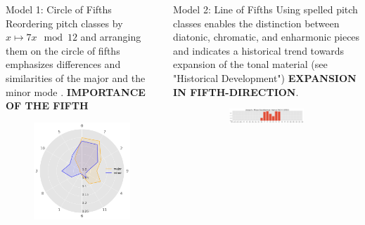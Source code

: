\documentclass[final]{beamer}
\begin{document}
\begin{frame}[t]
\begin{minipage}[t][.65\textheight][t]{\textwidth}
\begin{columns}[t]
\begin{column}{0.3\textwidth}
      \begin{block}{Model 1: Circle of Fifths}
				\alert{Reordering} pitch classes by $x\mapsto 7x \mod 12$ and arranging them on the \alert{circle of fifths} emphasizes differences and similarities of the major and the minor mode \autocite{Harasim2019}. \textbf{IMPORTANCE OF THE FIFTH}
        \begin{figure}
          \centering
          \includegraphics[width=.85\textwidth]{img/radars}
        \end{figure}
      \end{block}

    \end{column}

    \begin{column}{0.3\textwidth}

      \begin{block}{Model 2: Line of Fifths}
        Using \alert{spelled pitch classes} enables the distinction between diatonic, chromatic, and enharmonic pieces \autocite{Gardonyi2002} and indicates a historical trend towards expansion of the tonal material (see "Historical Development") \textbf{EXPANSION IN FIFTH-DIRECTION}.
        \begin{figure}
				\centering

				\begin{subfigure}{\textwidth} %
					\includegraphics[width=\textwidth]{img/gmm_josquin.png}
				\end{subfigure}


\end{figure}
\end{block}
\end{column}
\end{columns}
\end{minipage}
\end{frame}
\end{document}

